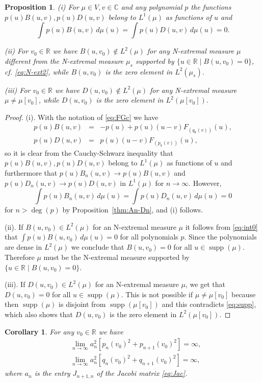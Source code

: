 \documentclass [12pt]{article}
\newtheorem{prop}[thm]{Proposition}
\newtheorem{cor}[thm]{Corollary}
\DeclareMathOperator{\supp}{supp}
\newcommand{\C}{\mathbb{C}}
\newcommand{\R}{\mathbb{R}}
\begin{document}
\begin{prop}\label{thm:1-2} (i) For $\mu\in V, v\in\C$ and any polynomial $p$ the functions $p(u)B(u,v), p(u)D(u,v)$ belong to $L^1(\mu)$ as functions of $u$ and
$$
\int p(u)B(u,v)\,d\mu(u)=\int p(u)D(u,v)\,d\mu(u)=0.
$$ 

(ii) For $v_0\in\R$ we have $B(u,v_0)\notin L^2(\mu)$ for any N-extremal measure $\mu$ different from the N-extremal measure $\mu_s$ supported by $\{u\in\R \mid B(u,v_0)=0\}$, cf. \eqref{eq:N-ext2}, while $B(u,v_0)$ is the zero element in $L^2(\mu_s)$.

(iii) For $v_0\in\R$ we have $D(u,v_0)\notin L^2(\mu)$ for any N-extremal measure $\mu\neq \mu[v_0]$, while $D(u,v_0)$ is the zero element in $L^2(\mu[v_0])$.
 \end{prop} 

\begin{proof} (i). With the notation of \eqref{eq:FGc} we have
\begin{eqnarray*}
p(u)B(u,v)&=&-p(u)+p(u)(u-v)F_{(q_k(v))}(u),\\
 p(u)D(u,v)&=&p(u)(u-v)F_{(p_k(v))}(u),
\end{eqnarray*}
so it is clear from the Cauchy-Schwarz inequality that $p(u)B(u,v), p(u)D(u,v)$ belong to $L^1(\mu)$ as functions of $u$ and furthermore that
$p(u)B_n(u,v)\to p(u)B(u,v)$ and $p(u)D_n(u,v)\to p(u)D(u,v)$  in $L^1(\mu)$ for $n\to\infty$. However,
\begin{equation}\label{eq:int0}
\int p(u)B_n(u,v)\,d\mu(u)=\int p(u)D_n(u,v)\,d\mu(u)=0
\end{equation}
 for $n>\deg(p)$ by Proposition~\ref{thm:An-Dn}, and (i) follows.

(ii). If $B(u,v_0)\in L^2(\mu)$ for an N-extremal measure $\mu$ it follows from \eqref{eq:int0} that $\int p(u)B(u,v_0)\,d\mu(u)=0$ for all polynomials $p$. Since the polynomials are dense in $L^2(\mu)$ we conclude that $B(u,v_0)=0$ for all $u\in\supp(\mu)$. Therefore $\mu$ must be the N-extremal measure supported by $\{u\in\R \mid B(u,v_0)=0\}$.

(iii). If $D(u,v_0)\in L^2(\mu)$ for an N-extremal measure $\mu$, we get that $D(u,v_0)=0$ for all $u\in\supp(\mu)$. This is not possible if $\mu\neq \mu[v_0]$ because then  
$\supp(\mu)$ is disjoint from $\supp(\mu[v_0])$ and this contradicts \eqref{eq:supp}, which also shows that  $D(u,v_0)$ is the zero element in $L^2(\mu[v_0])$.
\end{proof}

\begin{cor}\label{thm:limit} For any $v_0\in\R$ we have
\begin{eqnarray*}
&\lim_{n\to\infty} a_n^2[p_n(v_0)^2+p_{n+1}(v_0)^2]=\infty,\\
&\lim_{n\to\infty} a_n^2[q_n(v_0)^2+q_{n+1}(v_0)^2]=\infty,
\end{eqnarray*}
where $a_n$ is the entry $J_{n+1,n}$  of the Jacobi matrix \eqref{eq:Jac}.
\end{cor}
\end{document}
